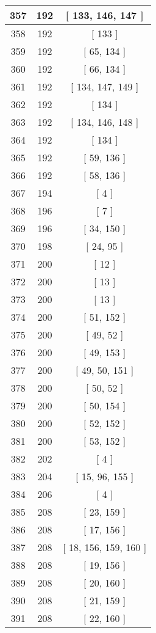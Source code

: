 \begin{center}
\begin{longtable}[H]{|| c c c ||}
\hline
357 & 192 & [ 133, 146, 147 ] \\ 
\hline
358 & 192 & [ 133 ] \\ 
\hline
359 & 192 & [ 65, 134 ] \\ 
\hline
360 & 192 & [ 66, 134 ] \\ 
\hline
361 & 192 & [ 134, 147, 149 ] \\ 
\hline
362 & 192 & [ 134 ] \\ 
\hline
363 & 192 & [ 134, 146, 148 ] \\ 
\hline
364 & 192 & [ 134 ] \\ 
\hline
365 & 192 & [ 59, 136 ] \\ 
\hline
366 & 192 & [ 58, 136 ] \\ 
\hline
367 & 194 & [ 4 ] \\ 
\hline
368 & 196 & [ 7 ] \\ 
\hline
369 & 196 & [ 34, 150 ] \\ 
\hline
370 & 198 & [ 24, 95 ] \\ 
\hline
371 & 200 & [ 12 ] \\ 
\hline
372 & 200 & [ 13 ] \\ 
\hline
373 & 200 & [ 13 ] \\ 
\hline
374 & 200 & [ 51, 152 ] \\ 
\hline
375 & 200 & [ 49, 52 ] \\ 
\hline
376 & 200 & [ 49, 153 ] \\ 
\hline
377 & 200 & [ 49, 50, 151 ] \\ 
\hline
378 & 200 & [ 50, 52 ] \\ 
\hline
379 & 200 & [ 50, 154 ] \\ 
\hline
380 & 200 & [ 52, 152 ] \\ 
\hline
381 & 200 & [ 53, 152 ] \\ 
\hline
382 & 202 & [ 4 ] \\ 
\hline
383 & 204 & [ 15, 96, 155 ] \\ 
\hline
384 & 206 & [ 4 ] \\ 
\hline
385 & 208 & [ 23, 159 ] \\ 
\hline
386 & 208 & [ 17, 156 ] \\ 
\hline
387 & 208 & [ 18, 156, 159, 160 ] \\ 
\hline
388 & 208 & [ 19, 156 ] \\ 
\hline
389 & 208 & [ 20, 160 ] \\ 
\hline
390 & 208 & [ 21, 159 ] \\ 
\hline
391 & 208 & [ 22, 160 ] \\ 

\end{longtable}
\end{center}
